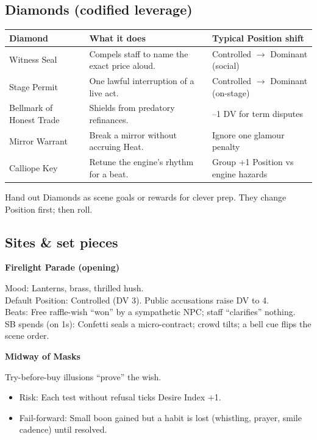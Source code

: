 \documentclass[11pt]{article}
\newcommand{\divider}{\vspace{12pt}\noindent\makebox[\linewidth]{\rule{\textwidth}{0.4pt}}\vspace{12pt}}
\begin{document}
\divider

\subsection*{Diamonds (codified leverage)}

\begin{longtable}{|l|l|l|}
\hline
\textbf{Diamond} & \textbf{What it does} & \textbf{Typical Position shift} \\
\hline
Witness Seal & Compels staff to name the exact price aloud. & Controlled $\rightarrow$ Dominant (social) \\
Stage Permit & One lawful interruption of a live act. & Controlled $\rightarrow$ Dominant (on-stage) \\
Bellmark of Honest Trade & Shields from predatory refinances. & --1 DV for term disputes \\
Mirror Warrant & Break a mirror without accruing Heat. & Ignore one glamour penalty \\
Calliope Key & Retune the engine's rhythm for a beat. & Group +1 Position vs engine hazards \\
\hline
\end{longtable}

Hand out Diamonds as scene goals or rewards for clever prep. They change Position first; then roll.

\divider

\subsection*{Sites \& set pieces}

\textbf{Firelight Parade (opening)}

Mood: Lanterns, brass, thrilled hush. \\
Default Position: Controlled (DV 3). Public accusations raise DV to 4. \\
Beats: Free raffle-wish ``won'' by a sympathetic NPC; staff ``clarifies'' nothing. \\
SB spends (on 1s): Confetti seals a micro-contract; crowd tilts; a bell cue flips the scene order.

\textbf{Midway of Masks}

Try-before-buy illusions ``prove'' the wish.
\begin{itemize}
\item Risk: Each test without refusal ticks Desire Index +1.
\item Fail-forward: Small boon gained but a habit is lost (whistling, prayer, smile cadence) until resolved.
\end{itemize}
\end{document}
